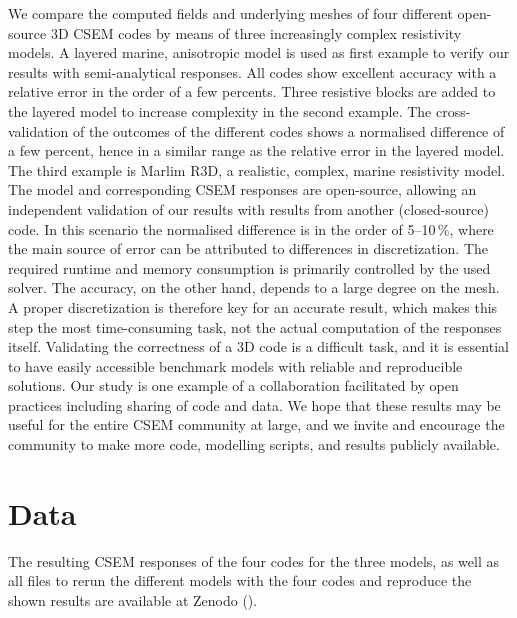 \documentclass[extra, camera,%
]{gji}
\begin{document}
We compare the computed fields and underlying meshes of four different open-source 3D CSEM codes by means of three increasingly complex resistivity models. A layered marine, anisotropic model is used as first example to verify our results with semi-analytical responses. All codes show excellent accuracy with a relative error in the order of a few percents. Three resistive blocks are added to the layered model to increase complexity in the second example. The cross-validation of the outcomes of the different codes shows a normalised difference of a few percent, hence in a similar range as the relative error in the layered model. The third example is Marlim R3D, a realistic, complex, marine resistivity model. The  model and corresponding CSEM responses are open-source, allowing an independent validation of our results with results from another (closed-source) code. In this scenario the normalised difference is in the order of 5--10\,\%, where the main source of error can be attributed to differences in discretization. The required runtime and memory consumption is primarily controlled by the used solver. The accuracy, on the other hand, depends to a large degree on the mesh. A proper discretization is therefore key for an accurate result, which makes this step the most time-consuming task, not the actual computation of the responses itself. Validating the correctness of a 3D code is a difficult task, and it is essential to have easily accessible benchmark models with reliable and reproducible solutions. Our study is one example of a collaboration facilitated by open practices including sharing of code and data. We hope that these results may be useful for the entire CSEM community at large, and we invite and encourage the community to make more code, modelling scripts, and results publicly available.


\section{Data}
The resulting CSEM responses of the four codes for the three models, as well as all files to rerun the different models with the four codes and reproduce the shown results are available at Zenodo ().
\end{document}
